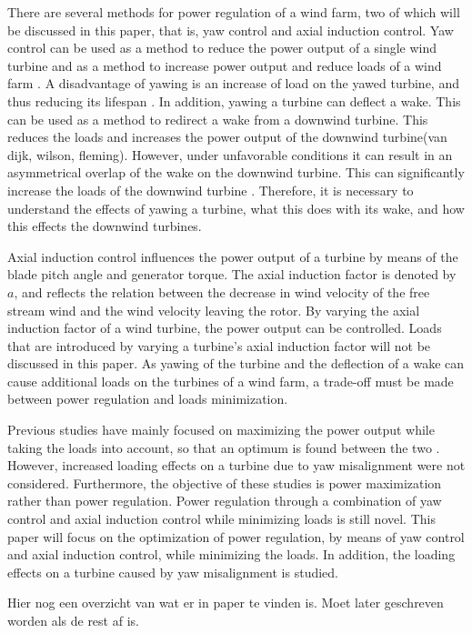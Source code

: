 There are several methods for power regulation of a wind farm, two of which will be discussed in this paper, that is, yaw control and axial induction control. Yaw control can be used as a method to reduce the power output of a single wind turbine and as a method to increase power output and reduce loads of a wind farm \cite{Dijk2016, Wilson2017, Fleming2014, vanDijk2016}. A disadvantage of yawing is an increase of load on the yawed turbine, and thus reducing its lifespan \cite{Zalkind2016,Kanev2017}. In addition, yawing a turbine can deflect a wake. This can be used as a method to redirect a wake from a downwind turbine. This reduces the loads and increases the power output of the downwind turbine(van dijk, wilson, fleming). However, under unfavorable conditions it can result in an asymmetrical overlap of the wake on the downwind turbine. This can significantly increase the loads of the downwind turbine \cite{Wilson2017,Dijk2016}. Therefore, it is necessary to understand the effects of yawing a turbine, what this does with its wake, and how this effects the downwind turbines. 

Axial induction control influences the power output of a turbine by means of the blade pitch angle and generator torque. The axial induction factor is denoted by $a$, and reflects the relation between the decrease in wind velocity of the free stream wind and the wind velocity leaving the rotor. By varying the axial induction factor of a wind turbine, the power output can be controlled. Loads that are introduced by varying a turbine's axial induction factor will not be discussed in this paper. 
As yawing of the turbine and the deflection of a wake can cause additional loads on the turbines of a wind farm, a trade-off must be made between power regulation and loads minimization.

Previous studies have mainly focused on maximizing the power output while taking the loads into account, so that an optimum is found between the two \cite{Dijk2016, vanDijk2016, Wilson2017}. However, increased loading effects on a turbine due to yaw misalignment were not considered. Furthermore, the objective of these studies is power maximization rather than power regulation. %
Power regulation through a combination of yaw control and axial induction control while minimizing loads is still novel. This paper will focus on the optimization of power regulation, by means of yaw control and axial induction control, while minimizing the loads. In addition, the loading effects on a turbine caused by yaw misalignment is studied. 

Hier nog een overzicht van wat er in paper te vinden is. Moet later geschreven worden als de rest af is.
